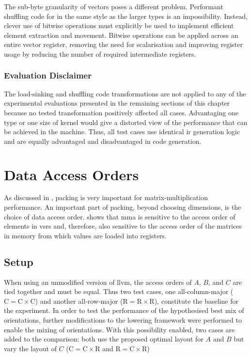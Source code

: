 \documentclass[\main/thesis.tex]{subfiles}
\begin{document}
The sub-byte granularity of  vectors poses a different problem.
Performant shuffling code for  in the same style as the larger types is an impossibility.
Instead, clever use of bitwise operations must explicitly be used to implement efficient element extraction and movement.
Bitwise operations can be applied across an entire vector register, removing the need for scalarisation and improving register usage by reducing the number of required intermediate registers.

\subsubsection{Evaluation Disclaimer}
The load-sinking and shuffling code transformations are not applied to any of the experimental evaluations presented in the remaining sections of this chapter because no tested transformation positively affected all cases.
Advantaging one type or one size of kernel would give a distorted view of the performance that can be achieved in the machine.
Thus, all test cases use identical \gls{ir} generation logic and are equally advantaged and disadvantaged in code generation.

\section{Data Access Orders}
\label{sec:variedOrders}
As discussed in , packing is very important for matrix-multiplication performance.
An important part of packing, beyond choosing dimensions, is the choice of data access order.
 shows that \gls{mma} is sensitive to the access order of elements in \glspl{vsr} and, therefore, also sensitive to the access order of the matrices in memory from which values are loaded into registers.

\subsection{Setup}
When using an unmodified version of \gls{llvm}, the access orders of $A$, $B$, and $C$ are tied together and must be equal.
Thus two test cases, one all-column-major ($\textrm{C} = \textrm{C} \times \textrm{C}$) and another all-row-major ($\textrm{R} = \textrm{R} \times \textrm{R}$), constitute the baseline for the experiment.
In order to test the performance of the hypothesised best mix of orientations, further modifications to the lowering framework were performed to enable the mixing of orientations.
With this possibility enabled, two cases are added to the comparison: both use the proposed optimal layout for $A$ and $B$ but vary the layout of $C$ ($\textrm{C} = \textrm{C} \times \textrm{R}$ and $\textrm{R} = \textrm{C} \times \textrm{R}$)
\end{document}
